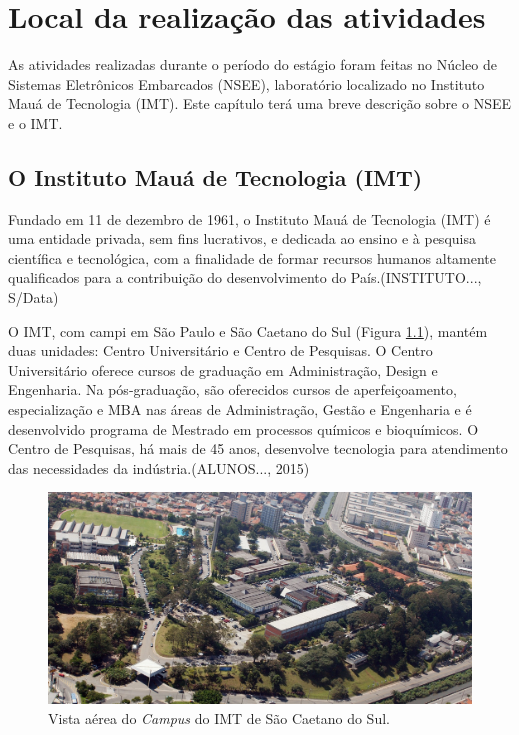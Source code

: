 \chapter{Local da realização das atividades}
As atividades realizadas durante o período do estágio foram feitas no Núcleo de Sistemas Eletrônicos Embarcados (NSEE), laboratório localizado no Instituto Mauá de Tecnologia (IMT). Este capítulo terá uma breve descrição sobre o NSEE e o IMT.

\section{O Instituto Mauá de Tecnologia (IMT)}
Fundado em 11 de dezembro de 1961, o Instituto Mauá de Tecnologia (IMT) é uma entidade privada, sem fins lucrativos, e dedicada ao ensino e à pesquisa científica e tecnológica, com a finalidade de formar recursos humanos altamente qualificados para a contribuição do desenvolvimento do País.(\uppercase{Instituto...}, S/Data) \let\thefootnote\relax{}

O IMT, com campi em São Paulo e São Caetano do Sul (Figura \ref{IMT}), mantém duas unidades: Centro Universitário e Centro de Pesquisas. O Centro Universitário oferece cursos de graduação em Administração, Design e Engenharia. Na pós-graduação, são oferecidos cursos de aperfeiçoamento, especialização e MBA nas áreas de Administração, Gestão e Engenharia e é desenvolvido programa de Mestrado em processos químicos e bioquímicos. O Centro de Pesquisas, há mais de 45 anos, desenvolve tecnologia para atendimento das necessidades da indústria.(\uppercase{Alunos...}, 2015) \let\thefootnote\relax{}

\let\thefootnote\svthefootnote

\begin{figure}[!htb]
	\centering
	\includegraphics[scale = 1]{Imagens/Campus_IMT_foto_aerea.jpg}
	\caption{Vista aérea do \textit{Campus} do IMT de São Caetano do Sul.}
	\label{IMT}
\end{figure}

